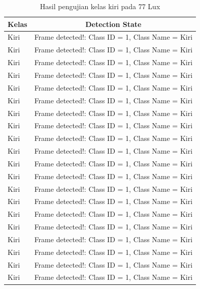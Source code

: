 \begin{longtable}{|l|c|}
  \caption{Hasil pengujian kelas kiri pada 77 Lux}
  \label{tb:lux77kiri} \\
  \hline
  \rowcolor[HTML]{C0C0C0} 
  \textbf{Kelas} & \textbf{Detection State}                           \\ \hline
  Kiri           & Frame detected!: Class ID = 1, Class Name = Kiri \\ \hline
  Kiri           & Frame detected!: Class ID = 1, Class Name = Kiri \\ \hline
  Kiri           & Frame detected!: Class ID = 1, Class Name = Kiri \\ \hline
  Kiri           & Frame detected!: Class ID = 1, Class Name = Kiri \\ \hline
  Kiri           & Frame detected!: Class ID = 1, Class Name = Kiri \\ \hline
  Kiri           & Frame detected!: Class ID = 1, Class Name = Kiri \\ \hline
  Kiri           & Frame detected!: Class ID = 1, Class Name = Kiri \\ \hline
  Kiri           & Frame detected!: Class ID = 1, Class Name = Kiri \\ \hline
  Kiri           & Frame detected!: Class ID = 1, Class Name = Kiri \\ \hline
  Kiri           & Frame detected!: Class ID = 1, Class Name = Kiri \\ \hline
  Kiri           & Frame detected!: Class ID = 1, Class Name = Kiri \\ \hline
  Kiri           & Frame detected!: Class ID = 1, Class Name = Kiri \\ \hline
  Kiri           & Frame detected!: Class ID = 1, Class Name = Kiri \\ \hline
  Kiri           & Frame detected!: Class ID = 1, Class Name = Kiri \\ \hline
  Kiri           & Frame detected!: Class ID = 1, Class Name = Kiri \\ \hline
  Kiri           & Frame detected!: Class ID = 1, Class Name = Kiri \\ \hline
  Kiri           & Frame detected!: Class ID = 1, Class Name = Kiri \\ \hline
  Kiri           & Frame detected!: Class ID = 1, Class Name = Kiri \\ \hline
  Kiri           & Frame detected!: Class ID = 1, Class Name = Kiri \\ \hline
  Kiri           & Frame detected!: Class ID = 1, Class Name = Kiri \\ \hline

\end{longtable}
